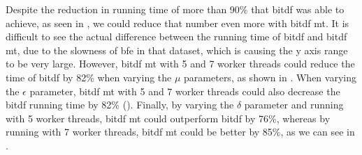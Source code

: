 {Despite the reduction in running time of more than 90\% that \ac{bitdf} was able to achieve, as seen in
, we could reduce that number even more with \ac{bitdf} \ac{mt}. It is difficult to see the actual
difference between the running time of \ac{bitdf} and \ac{bitdf} \ac{mt}, due to the slowness of \ac{bfe} in that
dataset, which is causing the y axis range to be very large. However, \ac{bitdf} \ac{mt} with 5 and 7 worker threads
could reduce the time of \ac{bitdf} by 82\% when varying the $\mu$ parameters, as shown in
. When varying the $\epsilon$ parameter, \ac{bitdf} \ac{mt} with 5 and 7 worker
threads could also decrease the \ac{bitdf} running time by 82\% (). Finally, by
varying the $\delta$ parameter and running with 5 worker threads, \ac{bitdf} \ac{mt} could outperform \ac{bitdf} by
76\%, whereas by running with 7 worker threads, \ac{bitdf} \ac{mt} could be better by 85\%, as we can see in
.

}
